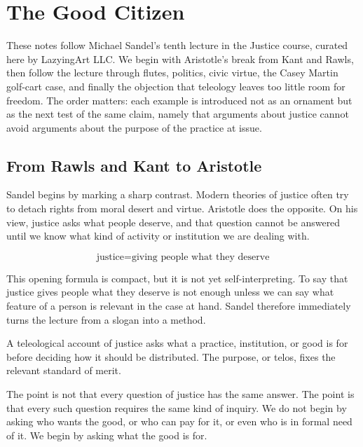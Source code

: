 \chapter{The Good Citizen}

These notes follow Michael Sandel's tenth lecture in the Justice course, curated here by LazyingArt LLC. We begin with Aristotle's break from Kant and Rawls, then follow the lecture through flutes, politics, civic virtue, the Casey Martin golf-cart case, and finally the objection that teleology leaves too little room for freedom. The order matters: each example is introduced not as an ornament but as the next test of the same claim, namely that arguments about justice cannot avoid arguments about the purpose of the practice at issue.

\section{From Rawls and Kant to Aristotle}

Sandel begins by marking a sharp contrast. Modern theories of justice often try to detach rights from moral desert and virtue. Aristotle does the opposite. On his view, justice asks what people deserve, and that question cannot be answered until we know what kind of activity or institution we are dealing with.

\begin{equation}
\text{justice}=\text{giving people what they deserve}
\end{equation}

This opening formula is compact, but it is not yet self-interpreting. To say that justice gives people what they deserve is not enough unless we can say what feature of a person is relevant in the case at hand. Sandel therefore immediately turns the lecture from a slogan into a method.

\begin{definition}
A teleological account of justice asks what a practice, institution, or good is for before deciding how it should be distributed. The purpose, or telos, fixes the relevant standard of merit.
\end{definition}

The point is not that every question of justice has the same answer. The point is that every such question requires the same kind of inquiry. We do not begin by asking who wants the good, or who can pay for it, or even who is in formal need of it. We begin by asking what the good is for.

